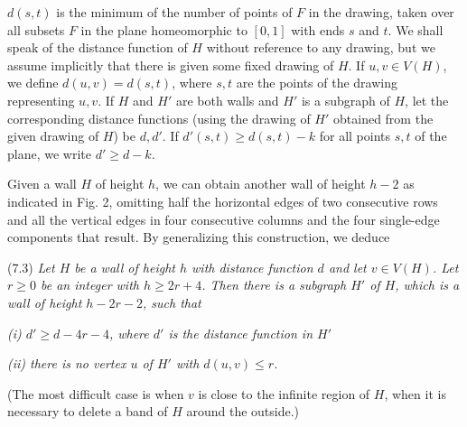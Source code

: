 \noindent $d(s, t)$ is the minimum of the number of points of $F$ in the drawing, taken over all subsets $F$ in the plane homeomorphic to $[0, 1]$ with ends $s$ and $t$. We shall speak of the distance function of $H$ without reference to any drawing, but we assume implicitly that there is given some fixed drawing of $H$. If $u, v \in V(H)$, we define $d(u, v) = d(s, t)$, where $s, t$ are the points of the drawing representing $u, v$. If $H$ and $H'$ are both walls and $H'$ is a subgraph of $H$, let the corresponding distance functions (using the drawing of $H'$ obtained from the given drawing of $H$) be $d, d'$. If $d'(s, t) \ge d(s, t) - k$ for all points $s, t$ of the plane, we write $d' \ge d - k$.

Given a wall $H$ of height $h$, we can obtain another wall of height $h - 2$ as indicated in Fig. 2, omitting half the horizontal edges of two consecutive rows and all the vertical edges in four consecutive columns and the four single-edge components that result. By generalizing this construction, we deduce

\stmt
(7.3) \textit{Let $H$ be a wall of height $h$ with distance function $d$ and let $v \in V(H)$. Let $r \ge 0$ be an integer with $h \ge 2r + 4$. Then there is a subgraph $H'$ of $H$, which is a wall of height $h - 2r - 2$, such that}

\textit{(i) $d' \ge d - 4r - 4$, where $d'$ is the distance function in $H'$}

\textit{(ii) there is no vertex $u$ of $H'$ with $d(u, v) \le r$.}

 (The most difficult case is when $v$ is close to the infinite region of $H$, when it is necessary to delete a band of $H$ around the outside.)

